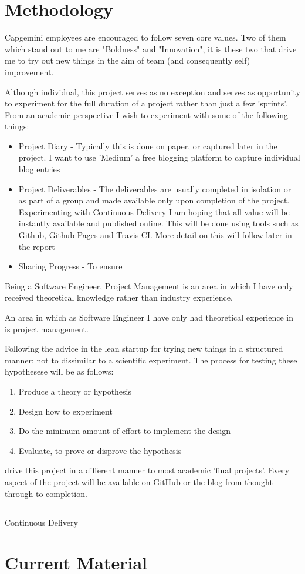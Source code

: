 \section{Methodology}
Capgemini employees are encouraged to follow seven core values. Two of them
which stand out to me are "Boldness" and "Innovation", it is these two that
drive me to try out new things in the aim of team (and consequently self)
improvement.

Although individual, this project serves as no exception and serves as
opportunity to experiment for the full duration of a project rather than just a
few 'sprints'. From an academic perspective I wish to experiment with some of
 the following things:
 \begin{itemize}
  \item Project Diary - Typically this is done on paper, or captured later in
   the project. I want to use 'Medium' a free blogging platform to capture
   individual blog entries
  \item Project Deliverables - The deliverables are usually completed in
  isolation or as part of a group and made available only upon completion of
  the project. Experimenting with Continuous Delivery I am hoping
  that all value will be instantly available and published online. This will
  be done using tools such as Github, Github Pages and Travis CI. More detail
   on this will follow later in the report
 \item Sharing Progress - To ensure
 \end{itemize}

Being a Software Engineer, Project Management is an area in
which I have only received theoretical knowledge rather than industry experience.

An area in which as Software Engineer I have only had
theoretical experience in is project management.

Following the advice in the lean startup for trying new things
 in a structured manner; not to dissimilar to a scientific experiment. The
 process for testing these hypothesese will be as follows:
  \begin{enumerate}
    \item Produce a theory or hypothesis
    \item Design how to experiment
    \item Do the minimum amount of effort to implement the design
    \item Evaluate, to prove or disprove the hypothesis
  \end{enumerate}


drive
this project
in a different
manner
to most academic 'final projects'. Every aspect of the
project will be available on GitHub or the blog from thought through to completion.
\subsection{}
Continuous Delivery


\section{Current Material}




